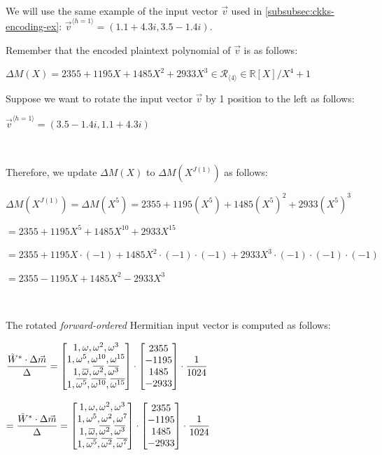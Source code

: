 $ $

We will use the same example of the input vector $\vec{v}$ used in \autoref{subsubsec:ckks-encoding-ex}: $\vec{v}^{\langle h=1 \rangle} = (1.1 + 4.3i, 3.5 - 1.4i)$.

Remember that the encoded plaintext polynomial of $\vec{v}$ is as follows: 

$\Delta M(X) = 2355 + 1195X + 1485X^2 + 2933X^3 \in \mathcal{R}_{\langle 4 \rangle} \in \mathbb{R}[X] / X^4 + 1$


Suppose we want to rotate the input vector $\vec{v}$ by 1 position to the left as follows: 

$\vec{v}^{\langle h=1 \rangle} = (3.5 - 1.4i, 1.1 + 4.3i)$

$ $

Therefore, we update $\Delta M(X)$ to $\Delta M(X^{J(1)})$ as follows:

$\Delta M(X^{J(1)}) = \Delta M(X^{5}) = 2355 + 1195(X^5) + 1485(X^5)^2 + 2933(X^5)^3$ 

$= 2355 + 1195X^5 + 1485X^{10} + 2933X^{15}$

$= 2355 + 1195X\cdot(-1) + 1485X^{2}\cdot(-1)\cdot(-1) + 2933X^{3}\cdot(-1)\cdot(-1)\cdot(-1)$

$= 2355 - 1195X + 1485X^2 - 2933X^3$

$ $

The rotated \textit{forward-ordered} Hermitian input vector is computed as follows:

$\dfrac{\tilde W^* \cdot \Delta \vec{m}}{\Delta} = \begin{bmatrix}
1,\omega,\omega^2, \omega^3\\
1,\omega^5, \omega^{10},\omega^{15}\\
1,\overline{\omega}, \overline{\omega^2}, \overline{\omega^3}\\
1,\overline{\omega^5}, \overline{\omega^{10}}, \overline{\omega^{15}}
\end{bmatrix} \cdot \begin{bmatrix}
2355\\- 1195\\1485\\-2933
\end{bmatrix}\cdot \dfrac{1}{1024}$

$= \dfrac{\tilde W^* \cdot \Delta \vec{m}}{\Delta} = \begin{bmatrix}
1,\omega,\omega^2, \omega^3\\
1,\omega^5, \omega^{2},\omega^{7}\\
1,\overline{\omega}, \overline{\omega^2}, \overline{\omega^3}\\
1,\overline{\omega^5}, \overline{\omega^{2}}, \overline{\omega^{7}}
\end{bmatrix} \cdot \begin{bmatrix}
2355\\- 1195\\1485\\-2933
\end{bmatrix}\cdot \dfrac{1}{1024}$

